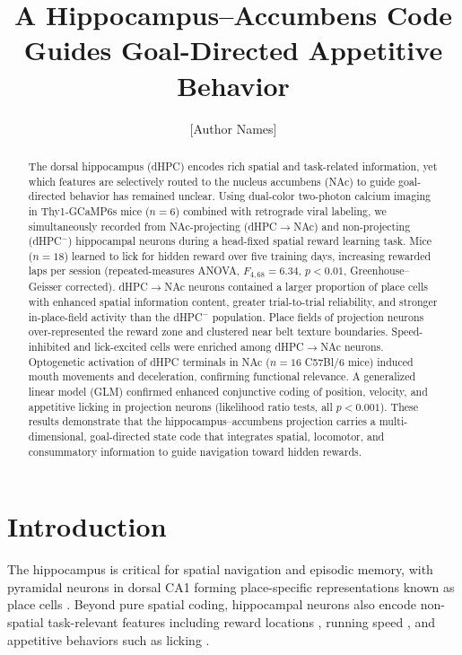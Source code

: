 \documentclass[11pt]{article}
\title{A Hippocampus--Accumbens Code Guides Goal-Directed Appetitive Behavior}
\author{[Author Names]}
\date{}
\begin{document}
\maketitle

\begin{abstract}
The dorsal hippocampus (dHPC) encodes rich spatial and task-related information, yet which features are selectively routed to the nucleus accumbens (NAc) to guide goal-directed behavior has remained unclear. Using dual-color two-photon calcium imaging in Thy1-GCaMP6s mice ($n=6$) combined with retrograde viral labeling, we simultaneously recorded from NAc-projecting (dHPC$\to$NAc) and non-projecting (dHPC$^-$) hippocampal neurons during a head-fixed spatial reward learning task. Mice ($n=18$) learned to lick for hidden reward over five training days, increasing rewarded laps per session (repeated-measures ANOVA, $F_{4,68}=6.34$, $p<0.01$, Greenhouse--Geisser corrected). dHPC$\to$NAc neurons contained a larger proportion of place cells with enhanced spatial information content, greater trial-to-trial reliability, and stronger in-place-field activity than the dHPC$^-$ population. Place fields of projection neurons over-represented the reward zone and clustered near belt texture boundaries. Speed-inhibited and lick-excited cells were enriched among dHPC$\to$NAc neurons. Optogenetic activation of dHPC terminals in NAc ($n=16$ C57Bl/6 mice) induced mouth movements and deceleration, confirming functional relevance. A generalized linear model (GLM) confirmed enhanced conjunctive coding of position, velocity, and appetitive licking in projection neurons (likelihood ratio tests, all $p<0.001$). These results demonstrate that the hippocampus--accumbens projection carries a multi-dimensional, goal-directed state code that integrates spatial, locomotor, and consummatory information to guide navigation toward hidden rewards.
\end{abstract}

\section{Introduction}

The hippocampus is critical for spatial navigation and episodic memory, with pyramidal neurons in dorsal CA1 forming place-specific representations known as place cells \citep{okeefe1971hippocampus,okeefe1978hippocampus,moser2008place}. Beyond pure spatial coding, hippocampal neurons also encode non-spatial task-relevant features including reward locations \citep{gauthier2018dedicated,dupret2010reactivation,hollup2001accumulation}, running speed \citep{mcnaughton1983contributions,kropff2015speed}, and appetitive behaviors such as licking \citep{aronov2017mapping}.
\end{document}
